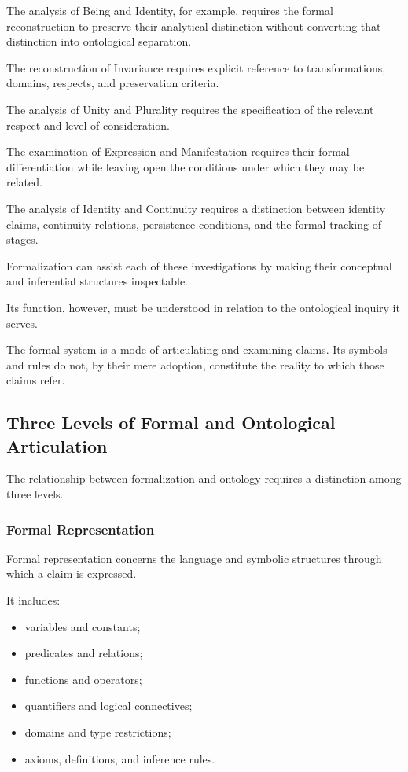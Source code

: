 The analysis of Being and Identity, for example,
requires the formal reconstruction to preserve
their analytical distinction without converting
that distinction into ontological separation.

The reconstruction of Invariance requires
explicit reference to transformations,
domains, respects, and preservation criteria.

The analysis of Unity and Plurality requires
the specification of the relevant respect
and level of consideration.

The examination of Expression and Manifestation
requires their formal differentiation while
leaving open the conditions under which
they may be related.

The analysis of Identity and Continuity requires
a distinction between identity claims,
continuity relations, persistence conditions,
and the formal tracking of stages.

Formalization can assist each of these
investigations by making their conceptual
and inferential structures inspectable.

Its function, however, must be understood
in relation to the ontological inquiry
it serves.

The formal system is a mode of articulating
and examining claims. Its symbols and rules
do not, by their mere adoption, constitute
the reality to which those claims refer.

\subsection{Three Levels of Formal and Ontological Articulation}

The relationship between formalization
and ontology requires a distinction
among three levels.

\subsubsection{Formal Representation}

Formal representation concerns the language
and symbolic structures through which
a claim is expressed.

It includes:

\begin{itemize}
    \item variables and constants;
    \item predicates and relations;
    \item functions and operators;
    \item quantifiers and logical connectives;
    \item domains and type restrictions;
    \item axioms, definitions, and inference rules.
\end{itemize}

